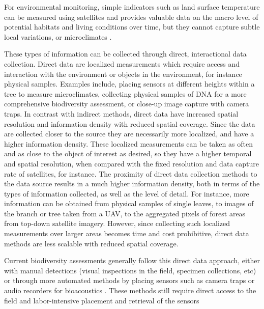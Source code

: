 For environmental monitoring, simple indicators such as land surface temperature can be measured using satellites and provides valuable data on the macro level of potential habitats and living conditions over time, but they cannot capture  subtle local variations, or microclimates \cite{Frenne2021, Zellweger2019AdvancesSensing}.




These types of information can be collected through direct, interactional data collection. Direct data are localized measurements which require access and interaction with the environment or objects in the environment, for instance physical samples. Examples include, placing sensors at different heights within a tree to measure microclimates, collecting physical samples of DNA for a more comprehensive biodiversity assessment, or close-up image capture with camera traps. In contrast with indirect methods, direct data have increased spatial resolution and information density with reduced spatial coverage. Since the data are collected closer to the source they are necessarily more localized, and have a higher information density. These localized measurements can be taken as often and as close to the object of interest as desired, so they have a higher temporal and spatial resolution, when compared with the fixed resolution and data capture rate of satellites, for instance. The proximity of direct data collection methods to the data source results in a much higher information density, both in terms of the types of information collected, as well as the level of detail. For instance, more information can be obtained from physical samples of single leaves, to images of the branch or tree taken from a UAV, to the aggregated pixels of forest areas from top-down satellite imagery. However, since collecting such localized measurements over larger areas becomes time and cost prohibitive, direct data methods are less scalable with reduced spatial coverage.

Current biodiversity assessments generally follow this direct data approach, either with manual detections (visual inspections in the field, specimen collections, etc) or through more automated methods by placing sensors such as camera traps or audio recorders for bioacoustics \cite{Muller2023}. These methods still require direct access to the field and labor-intensive placement and retrieval of the sensors

